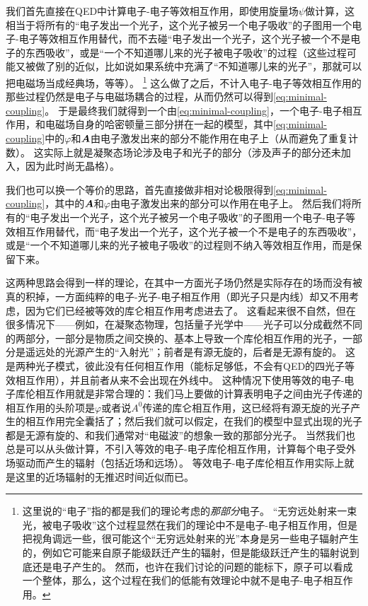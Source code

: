 我们首先直接在QED中计算电子-电子等效相互作用，即使用旋量场$\psi$做计算，这相当于将所有的“电子发出一个光子，这个光子被另一个电子吸收”的子图用一个电子-电子等效相互作用替代，而不去碰“电子发出一个光子，这个光子被一个不是电子的东西吸收”，或是“一个不知道哪儿来的光子被电子吸收”的过程（这些过程可能又被做了别的近似，比如说如果系统中充满了“不知道哪儿来的光子”，那就可以把电磁场当成经典场，等等）。%
\footnote{
    这里说的“电子”指的都是我们的理论考虑的\emph{那部分}电子。
    “无穷远处射来一束光，被电子吸收”这个过程显然在我们的理论中不是电子-电子相互作用，但是把视角调远一些，很可能这个“无穷远处射来的光”本身是另一些电子辐射产生的，例如它可能来自原子能级跃迁产生的辐射，但是能级跃迁产生的辐射说到底还是电子产生的。
    然而，也许在我们讨论的问题的能标下，原子可以看成一个整体，那么，这个过程在我们的低能有效理论中就不是电子-电子相互作用。
}%
这么做了之后，不计入电子-电子等效相互作用的那些过程仍然是电子与电磁场耦合的过程，从而仍然可以得到\eqref{eq:minimal-coupling}。
于是最终我们就得到一个由\eqref{eq:minimal-coupling}，一个电子-电子相互作用，和电磁场自身的哈密顿量三部分拼在一起的模型，其中\eqref{eq:minimal-coupling}中的$\varphi$和$\vb*{A}$由电子激发出来的部分不能作用在电子上（从而避免了重复计数）。
这实际上就是凝聚态场论涉及电子和光子的部分（涉及声子的部分还未加入，因为此时尚无晶格）。

我们也可以换一个等价的思路，首先直接做非相对论极限得到\eqref{eq:minimal-coupling}，其中的$\vb*{A}$和$\varphi$由电子激发出来的部分可以作用在电子上。
然后我们将所有的“电子发出一个光子，这个光子被另一个电子吸收”的子图用一个电子-电子等效相互作用替代，而“电子发出一个光子，这个光子被一个不是电子的东西吸收”，或是“一个不知道哪儿来的光子被电子吸收”的过程则不纳入等效相互作用，而是保留下来。

这两种思路会得到一样的理论，在其中一方面光子场仍然是实际存在的场而没有被真的积掉，一方面纯粹的电子-光子-电子相互作用（即光子只是内线）却又不用考虑，因为它们已经被等效的库仑相互作用考虑进去了。
这看起来很不自然，但在很多情况下——例如，在凝聚态物理，包括量子光学中——光子可以分成截然不同的两部分，一部分是物质之间交换的、基本上导致一个库伦相互作用的光子，一部分是遥远处的光源产生的“入射光”；前者是有源无旋的，后者是无源有旋的。
这是两种光子模式，彼此没有任何相互作用（能标足够低，不会有QED的四光子等效相互作用），并且前者从来不会出现在外线中。
这种情况下使用等效的电子-电子库伦相互作用就是非常合理的：我们马上要做的计算表明电子之间由光子传递的相互作用的头阶项是$\varphi$或者说$A^0$传递的库仑相互作用，这已经将有源无旋的光子产生的相互作用完全囊括了；然后我们就可以假定，在我们的模型中显式出现的光子都是无源有旋的、和我们通常对“电磁波”的想象一致的那部分光子。
当然我们也总是可以从头做计算，不引入等效的电子-电子库伦相互作用，计算每个电子受外场驱动而产生的辐射（包括近场和远场）。
等效电子-电子库伦相互作用实际上就是这里的近场辐射的无推迟时间近似而已。

